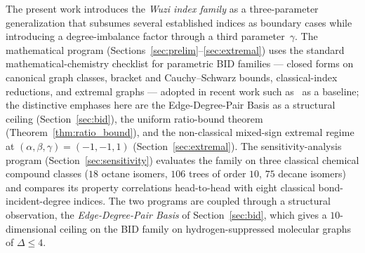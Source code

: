 \documentclass[11pt,a4paper]{article}
\theoremstyle{definition}
\begin{document}
The present work introduces the \emph{Wuzi index family} as a
three-parameter generalization that subsumes several established
indices as boundary cases while introducing a degree-imbalance
factor through a third parameter~$\gamma$. The mathematical
program (Sections~\ref{sec:prelim}--\ref{sec:extremal}) uses the
standard mathematical-chemistry checklist for parametric BID
families --- closed forms on canonical graph classes, bracket and
Cauchy--Schwarz bounds, classical-index reductions, and extremal
graphs --- adopted in recent work such
as~\cite{MovahediGutmanRedzepovicFurtula2026} as a baseline; the
distinctive emphases here are the Edge-Degree-Pair Basis as a
structural ceiling (Section~\ref{sec:bid}), the uniform ratio-bound
theorem (Theorem~\ref{thm:ratio_bound}), and the non-classical
mixed-sign extremal regime at $(\alpha, \beta, \gamma) = (-1, -1, 1)$
(Section~\ref{sec:extremal}). The sensitivity-analysis program
(Section~\ref{sec:sensitivity})
evaluates the family on three classical chemical compound classes
($18$ octane isomers, $106$ trees of order $10$, $75$ decane
isomers) and compares its property correlations head-to-head with
eight classical bond-incident-degree indices. The two programs are
coupled through a structural observation, the \emph{Edge-Degree-Pair
Basis} of Section~\ref{sec:bid}, which gives a $10$-dimensional
ceiling on the BID family on hydrogen-suppressed molecular graphs
of $\Delta\le 4$.
\end{document}
